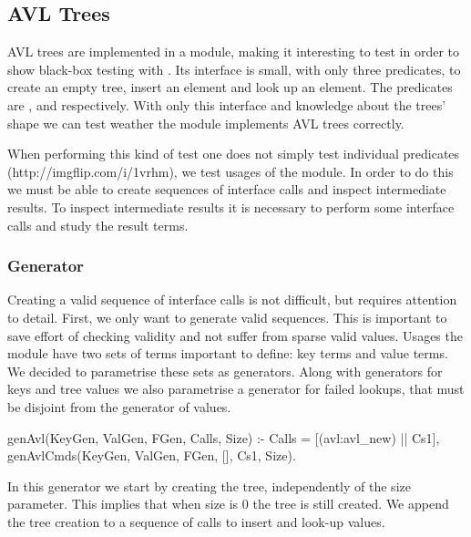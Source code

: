 

\subsection{AVL Trees}
AVL trees are implemented in a \Yap{} module, making it interesting to
test in order to show black-box testing with \plqc{}.
%
Its interface is small, with only three predicates, to create an empty
tree, insert an element and look up an element.
%
The predicates are ,  and
 respectively.
%
With only this interface and knowledge about the trees' shape we can
test weather the module implements AVL trees correctly.


When performing this kind of test one does not simply test individual
predicates (http://imgflip.com/i/1vrhm), we test usages of the module.
%
In order to do this we must be able to create sequences of interface
calls and inspect intermediate results.
%
To inspect intermediate results it is necessary to perform some
interface calls and study the result terms.

\subsubsection*{Generator}

Creating a valid sequence of interface calls is not difficult, but
requires attention to detail.
%
First, we only want to generate valid sequences.
%
This is important to save effort of checking validity and not suffer
from sparse valid values.
%
Usages the module  have two sets of terms important to
define: key terms and value terms.
%
We decided to parametrise these sets as generators.
%
Along with generators for keys and tree values we also parametrise a
generator for failed lookups, that must be disjoint from the generator
of values.
\begin{yapcode}
 genAvl(KeyGen, ValGen, FGen, Calls, Size) :-
   Calls = [(avl:avl_new) || Cs1],
   genAvlCmds(KeyGen, ValGen, FGen,
              [], Cs1, Size).
\end{yapcode}
%
In this generator we start by creating the tree, independently of the
size parameter.
%
This implies that when size is 0 the tree is still created.
%
We append the tree creation to a sequence of calls to insert and look-up
values.


